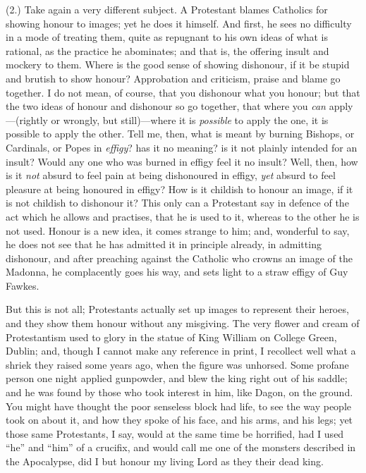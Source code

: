 (2.) Take again a very different subject. A Protestant
blames Catholics for showing honour to images; yet he
does it himself. And first, he sees no difficulty in a
mode of treating them, quite as repugnant to his own
ideas of what is rational, as the practice he abominates;
and that is, the offering insult and mockery to them.
Where is the good sense of showing dishonour, if it be
stupid and brutish to show honour? Approbation and
criticism, praise and blame go together. I do not mean,
of course, that you dishonour what you honour; but that
the two ideas of honour and dishonour so go together,
that where you \emph{can} apply—(rightly or
wrongly, but still)—where it is \emph{possible} to
apply the one, it is possible to apply the other. Tell
me, then, what is meant by burning Bishops, or Cardinals,
or Popes in \emph{effigy}? has it no meaning? is it not
plainly intended for an insult? Would any one who was
burned in effigy feel it no insult? Well, then, how is it
\emph{not} absurd to feel pain at being dishonoured in
effigy, \emph{yet} absurd to feel pleasure at being
honoured in effigy? How is it childish to honour an
image, if it is not childish to dishonour it? This only
can a Protestant say in defence of the act which he
allows and practises, that he is used to it, whereas to
the other he is not used. Honour is a new idea, it comes
strange to him; and, wonderful to say, he does not see
that he has admitted it in principle already, in
admitting dishonour, and after preaching against the
Catholic who crowns an image of the Madonna, he
complacently goes his way, and sets light to a straw
effigy of Guy Fawkes.

But this is not all; Protestants actually set up
images to represent their heroes, and they show them
honour without any misgiving. The very flower and cream
of Protestantism used to glory in the statue of King
William on College Green, Dublin; and, though I cannot
make any reference in print, I recollect well what a
shriek they raised some years ago, when the figure was
unhorsed. Some profane person one night applied
gunpowder, and blew the king right out of his saddle; and
he was found by those who took interest in him, like
Dagon, on the ground. You might have thought the poor
senseless block had life, to see the way people took on
about it, and how they spoke of his face, and his arms,
and his legs; yet those same Protestants, I say, would at
the same time be horrified, had I used ``he'' and
``him'' of a crucifix, and would call me one of
the monsters described in the Apocalypse, did I but
honour my living Lord as they their dead king.

